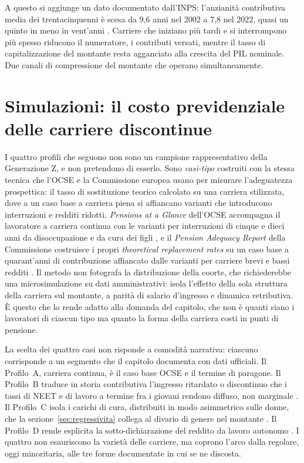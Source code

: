 \medskip
\noindent
A questo si aggiunge un dato documentato dall'INPS: l'anzianità
contributiva media dei trentacinquenni è scesa da 9,6 anni nel 2002 a 7,8
nel 2022, quasi un quinto in meno in vent'anni \cite{INPS2025}. Carriere
che iniziano più tardi e si interrompono più spesso riducono il numeratore,
i contributi versati, mentre il tasso di capitalizzazione del montante resta
agganciato alla crescita del PIL nominale. Due canali di compressione del
montante che operano simultaneamente.

\section{Simulazioni: il costo previdenziale delle carriere discontinue}
\label{sec:simulazioni}

\noindent
I quattro profili che seguono non sono un campione rappresentativo della
Generazione Z, e non pretendono di esserlo. Sono \emph{casi-tipo} costruiti con
la stessa tecnica che l'OCSE e la Commissione europea usano per misurare
l'adeguatezza prospettica: il tasso di sostituzione teorico calcolato su una
carriera stilizzata, dove a un caso base a carriera piena si affiancano varianti
che introducono interruzioni e redditi ridotti. \emph{Pensions at a Glance}
dell'OCSE accompagna il lavoratore a carriera continua con le varianti per
interruzioni di cinque e dieci anni da disoccupazione e da cura dei figli
\cite{OCSE2023}, e il \emph{Pension Adequacy Report} della Commissione costruisce
i propri \emph{theoretical replacement rates} su un caso base a quarant'anni di
contribuzione affiancato dalle varianti per carriere brevi e bassi redditi
\cite{EU_PAR2024}. Il metodo non fotografa la distribuzione della coorte, che
richiederebbe una microsimulazione su dati amministrativi: isola l'effetto della
sola struttura della carriera sul montante, a parità di salario d'ingresso e
dinamica retributiva. È questo che lo rende adatto alla domanda del capitolo, che
non è quanti siano i lavoratori di ciascun tipo ma quanto la forma della carriera
costi in punti di pensione.

\medskip
\noindent
La scelta dei quattro casi non risponde a comodità narrativa: ciascuno
corrisponde a un segmento che il capitolo documenta con dati ufficiali. Il
Profilo~A, carriera continua, è il caso base OCSE e il termine di paragone. Il
Profilo~B traduce in storia contributiva l'ingresso ritardato o discontinuo che i
tassi di NEET e di lavoro a termine fra i giovani rendono diffuso, non marginale
\cite{EUROSTAT_NEET2024, EUROSTAT_LFS_temporary2024}. Il Profilo~C isola i carichi
di cura, distribuiti in modo asimmetrico sulle donne, che la
sezione~\ref{sec:regressivita} collega al divario di genere nel montante
\cite{INPS2025}. Il Profilo~D rende esplicita la sotto-dichiarazione del reddito da
lavoro autonomo \cite{MEF_EvasioneFiscale2024, Albarea2020}. I quattro non
esauriscono la varietà delle carriere, ma coprono l'arco dalla regolare, oggi
minoritaria, alle tre forme documentate in cui se ne discosta.

